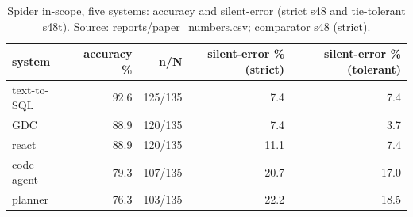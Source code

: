 \begin{table}[t]
\centering
\caption{Spider in-scope, five systems: accuracy and silent-error (strict s48 and tie-tolerant s48t). Source: reports/paper\_numbers.csv; comparator s48 (strict).}
\label{tab:spider}
\begin{tabular}{lrrrr}
\toprule
system & accuracy \% & n/N & silent-error \% (strict) & silent-error \% (tolerant) \\
\midrule
text-to-SQL & 92.6 & 125/135 & 7.4 & 7.4 \\
GDC & 88.9 & 120/135 & 7.4 & 3.7 \\
react & 88.9 & 120/135 & 11.1 & 7.4 \\
code-agent & 79.3 & 107/135 & 20.7 & 17.0 \\
planner & 76.3 & 103/135 & 22.2 & 18.5 \\
\bottomrule
\end{tabular}
\end{table}
